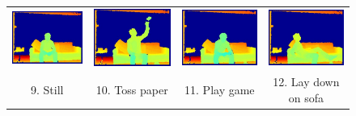 \documentclass[final,3p,times,twocolumn]{elsarticle}
\begin{document}
\begin{figure}[t]
{\begin{tabular}{cccc}
	        \includegraphics[width=0.4\columnwidth]{Figures/MSRDaily3D_still.pdf} &          \includegraphics[width=0.4\columnwidth]{Figures/MSRDaily3D_tosspaper.pdf} &          \includegraphics[width=0.4\columnwidth]{Figures/MSRDaily3D_playgame.pdf} &          \includegraphics[width=0.4\columnwidth]{Figures/MSRDaily3D_laydownonsofa.pdf} \\
	  			
	        9. Still &          10. Toss paper &         11. Play game &          12. Lay down on sofa \\
	  			

\end{tabular}}
\end{figure}
\end{document}
